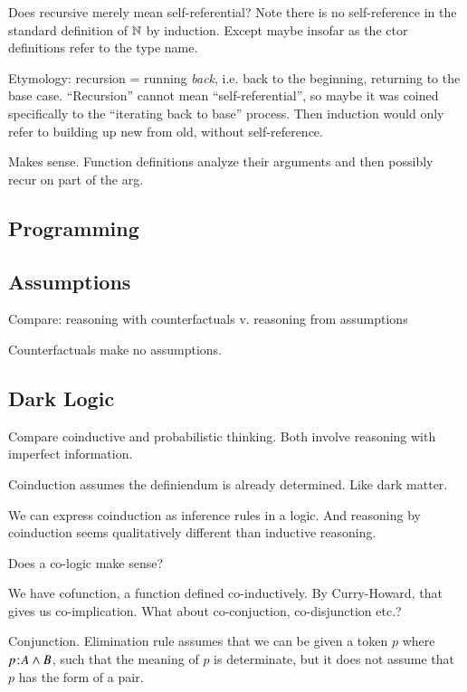 \documentclass{article}
\begin{document}
Does recursive merely mean self-referential? Note there is no
self-reference in the standard definition of \(\mathbb{N}\) by induction.
Except maybe insofar as the ctor definitions refer to the type name.

Etymology: recursion = running \textit{back}, i.e. back to the
beginning, returning to the base case. ``Recursion'' cannot mean
``self-referential'', so maybe it was coined specifically to the
``iterating back to base'' process. Then induction would only refer to
building up new from old, without self-reference.

Makes sense. Function definitions analyze their arguments and then
possibly recur on part of the arg.

\subsection{Programming}

 \cite{goguen1996algebraic}

\subsection{Assumptions}

Compare: reasoning with counterfactuals v. reasoning from assumptions

Counterfactuals make no assumptions.

\subsection{Dark Logic}

Compare coinductive and probabilistic thinking. Both involve reasoning
with imperfect information.

Coinduction assumes the definiendum is already determined. Like dark
matter.

We can express coinduction as inference rules in a logic. And
reasoning by coinduction seems qualitatively different than inductive
reasoning.

Does a co-logic make sense?

We have cofunction, a function defined co-inductively. By
Curry-Howard, that gives us co-implication. What about co-conjuction,
co-disjunction etc.?

Conjunction. Elimination rule assumes that we can be given a token
\(p\) where \(p\hspace{1pt}\mathpunct{:}\hspace{-1pt}A\land B\), such that the meaning of \(p\) is
determinate, but it does not assume that \(p\) has the form of a pair.
\end{document}
